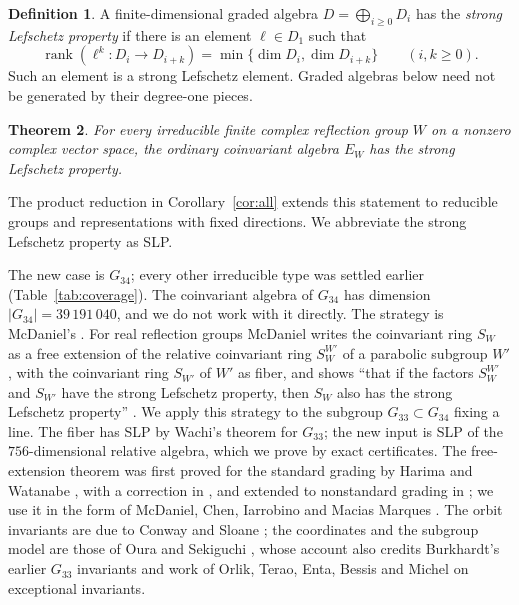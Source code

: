 \documentclass[11pt]{article}
\newtheorem{theorem}{Theorem}[section]
\theoremstyle{definition}
\newtheorem{definition}[theorem]{Definition}
\newcommand{\rank}{\operatorname{rank}}
\begin{document}
\begin{definition}
A finite-dimensional graded algebra $D=\bigoplus_{i\geq0}D_i$ has the
\emph{strong Lefschetz property} if there is an element $\ell\in D_1$
such that
\[
 \rank(\ell^k:D_i\longrightarrow D_{i+k})
                 =\min\{\dim D_i,\dim D_{i+k}\}
                       \qquad(i,k\geq0).
\]
Such an element is a strong Lefschetz element. Graded algebras below
need not be generated by their degree-one pieces.
\end{definition}

\begin{theorem}\label{thm:main}
For every irreducible finite complex reflection group $W$ on a nonzero
complex vector space, the ordinary coinvariant algebra $E_W$ has the
strong Lefschetz property.
\end{theorem}

The product reduction in Corollary~\ref{cor:all} extends this statement
to reducible groups and representations with fixed directions. We
abbreviate the strong Lefschetz property as SLP.

The new case is $G_{34}$; every other irreducible type was settled
earlier (Table~\ref{tab:coverage}). The coinvariant algebra of $G_{34}$
has dimension $|G_{34}|=39\,191\,040$, and we do not work with it
directly. The strategy is McDaniel's \cite[(1.1), Theorem~2 and
\S5]{McD}. For real reflection groups McDaniel writes the coinvariant
ring $S_W$ as a free extension of the relative coinvariant ring
$S_W^{W'}$ of a parabolic subgroup $W'$, with the coinvariant ring
$S_{W'}$ of $W'$ as fiber, and shows ``that if the factors $S_W^{W'}$
and $S_{W'}$ have the strong Lefschetz property, then $S_W$ also has the
strong Lefschetz property'' \cite[p.~2]{McD}. We apply this strategy to
the subgroup $G_{33}\subset G_{34}$ fixing a line. The fiber has SLP by
Wachi's theorem for $G_{33}$; the new input is SLP of the
$756$-dimensional relative algebra, which we prove by exact
certificates. The free-extension theorem was first proved for the
standard grading by Harima and Watanabe \cite{HW03}, with a correction in
\cite{HW03e}, and extended to nonstandard grading in
\cite[Theorem~6.1]{HW07}; we use it in the form of McDaniel, Chen,
Iarrobino and Macias Marques \cite[Propositions~2.22 and~3.1]{MCCM}. The
orbit invariants are due to Conway and Sloane \cite{CS}; the coordinates
and the subgroup model are those of Oura and Sekiguchi
\cite[\S\S2, 6.1, 6.2]{OS}, whose account also credits Burkhardt's
earlier $G_{33}$ invariants and work of Orlik, Terao, Enta, Bessis and
Michel on exceptional invariants.
\end{document}
